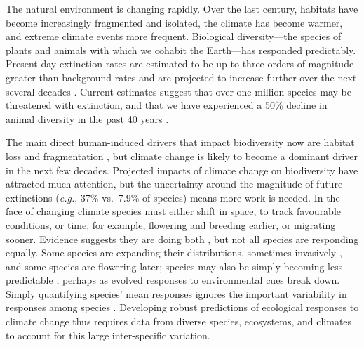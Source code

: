 \documentclass[12pt]{report}
\begin{document}
The natural environment is changing rapidly. Over the last century,
habitats have become increasingly fragmented and
isolated\supercite{Haddad2015}, the climate has become warmer, and
extreme climate events more frequent\supercite{IPCC2014}. Biological
diversity---the species of plants and animals with which we cohabit
the Earth---has responded predictably. Present-day extinction rates
are estimated to be up to three orders of magnitude greater than background
rates \supercite{Pimm2014} and are projected to increase further over
the next several decades \supercite{MEA2005}. Current estimates
suggest that over one million species may be threatened with
extinction\supercite{IPBESland2019}, and that we have experienced a
50\% decline in animal diversity in the past 40 years
\supercite{McLellan2014}.

The main direct human-induced drivers that impact biodiversity now are
habitat loss \supercite{Newbold2015} and fragmentation
\supercite{Haddad2015}, but climate change is likely to become a
dominant driver in the next few
decades\supercite{Parmesan2003,Thuiller2007,Urban2015}. Projected
impacts of climate change on biodiversity have attracted much
attention, but the uncertainty around the magnitude of future
extinctions (\emph{e.g.}, 37\%\supercite{Thomas2004} vs.\
7.9\%\supercite{Urban2015} of species) means more work is needed.  In
the face of changing climate species must either shift in space, to
track favourable conditions, or time, for example, flowering and
breeding earlier, or migrating sooner. Evidence suggests they are
doing both \supercite{Parmesan2003,Parmesan2006,Menzel2006,Chen2011},
but not all species are responding equally. Some species are expanding
their distributions, sometimes invasively \supercite{Hellmann2008},
and some species are flowering later\supercite{Cook2012}; species may
also be simply becoming less predictable
\supercite{Pearse2017phenology}, perhaps as evolved responses to
environmental cues break down.  Simply quantifying species' mean
responses ignores the important variability in responses among species
\supercite{Wolkovich2012}. Developing robust predictions of ecological
responses to climate change thus requires data from diverse species,
ecosystems, and climates to account for this large inter-specific
variation.
\end{document}
